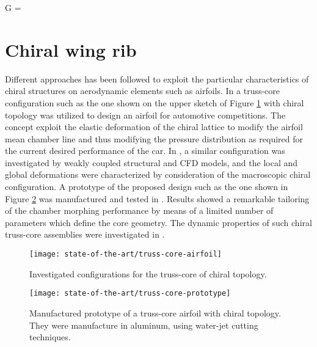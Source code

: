  \begin{eqution}\label{eq:shearModulus}
    G = 
  \end{eqution}

\clearpage
\section{Chiral wing rib} \label{sec:wingRibChiral_state}

  Different approaches has been followed to exploit the particular characteristics of chiral structures on aerodynamic elements such as airfoils. In \cite{Bornengo2005} a truss-core configuration such as the one shown on the upper sketch of Figure \ref{fig:truss-core-airfoil} with chiral topology was utilized to design an airfoil for automotive competitions. The concept exploit the elastic deformation of the chiral lattice to modify the airfoil mean chamber line and thus modifying the pressure distribution as required for the current desired performance of the car. In \cite{Spadoni2007a}, a similar configuration was investigated by weakly coupled structural and CFD models, and the local and global deformations were characterized by consideration of the macroscopic chiral configuration. A prototype of the proposed design such as the one shown in Figure \ref{fig:truss-core-prototype} was manufactured and tested in \cite{Spadoni2007b}. Results showed a remarkable tailoring of the chamber morphing performance by means of a limited number of parameters which define the core geometry. The dynamic properties of such chiral truss-core assemblies were investigated in \cite{Spadoni2006}.

  \begin{figure}[!htpb]
    \centering
    \texttt{[image: state-of-the-art/truss-core-airfoil]}
    \caption[Investigated configurations for the truss-core of chiral topology]{Investigated configurations for the truss-core of chiral topology. \cite{Spadoni2007a}}\label{fig:truss-core-airfoil}
  \end{figure}

  \begin{figure}[!htpb]
    \centering
    \texttt{[image: state-of-the-art/truss-core-prototype]}
    \caption[Manufactured prototype of a truss-core airfoil with chiral topology]{Manufactured prototype of a truss-core airfoil with chiral topology. They were manufacture in aluminum, using water-jet cutting techniques. \cite{Spadoni2007b}}\label{fig:truss-core-prototype}
  \end{figure}

